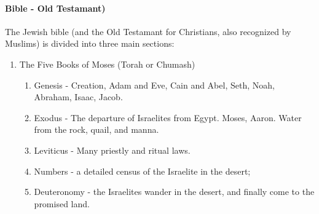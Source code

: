 				\paragraph{Bible - Old Testamant)} \label{Old Testamant}
				The Jewish bible (and the Old Testamant for Christians, also recognized by Muslims) is divided into three main sections:
				\begin{enumerate}
					\item The Five Books of Moses (Torah or Chumash)
					\begin{enumerate}
						\item Genesis - Creation, Adam and Eve, Cain and Abel, Seth, Noah, Abraham, Isaac, Jacob.  
						\item Exodus - The departure of Israelites from Egypt.  Moses, Aaron.  Water from the rock, quail, and manna.
						\item Leviticus - Many priestly and ritual laws. 
						\item Numbers - a detailed census of the Israelite in the desert; 
						\item Deuteronomy - the Israelites wander in the desert, and finally come to the promised land.
						

\end{enumerate}
\end{enumerate}
